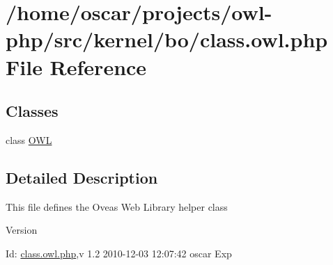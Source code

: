 \section{/home/oscar/projects/owl-\/php/src/kernel/bo/class.owl.php File Reference}
\label{class_8owl_8php}
\subsection*{Classes}
\begin{DoxyCompactItemize}
\item 
class \hyperlink{classOWL}{OWL}
\end{DoxyCompactItemize}


\subsection{Detailed Description}
This file defines the Oveas Web Library helper class \begin{DoxyVersion}{Version}

\end{DoxyVersion}
\begin{DoxyParagraph}{Id:}
\hyperlink{class_8owl_8php}{class.owl.php},v 1.2 2010-\/12-\/03 12:07:42 oscar Exp 
\end{DoxyParagraph}
